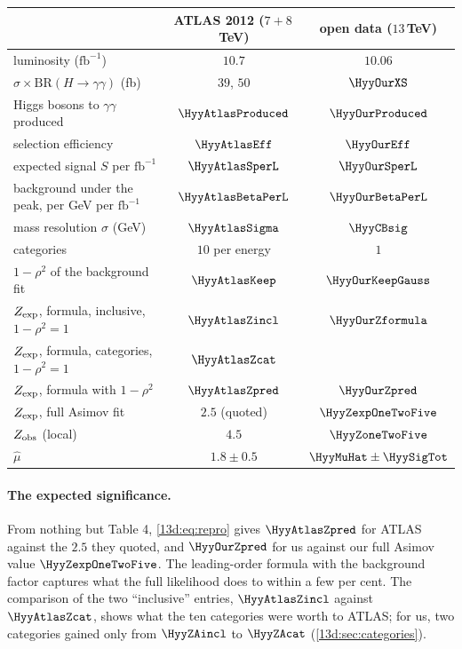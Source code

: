 \begin{center}
\small
\begin{tabular}{@{}lcc@{}}
\toprule
 & ATLAS 2012 ($7+8\,$TeV) & open data ($13\,$TeV)\\\midrule
luminosity ($\mathrm{fb}^{-1}$) & $10.7$ & $10.06$\\
$\sigma\times\mathrm{BR}(H\to\gamma\gamma)$ (fb) & $39$, $50$ & $\HyyOurXS$\\
Higgs bosons to $\gamma\gamma$ produced & $\HyyAtlasProduced$ & $\HyyOurProduced$\\
selection efficiency & $\HyyAtlasEff$ & $\HyyOurEff$\\
expected signal $S$ per $\mathrm{fb}^{-1}$ & $\HyyAtlasSperL$ & $\HyyOurSperL$\\
background under the peak, per GeV per $\mathrm{fb}^{-1}$ & $\HyyAtlasBetaPerL$ & $\HyyOurBetaPerL$\\
mass resolution $\sigma$ (GeV) & $\HyyAtlasSigma$ & $\HyyCBsig$\\
categories & $10$ per energy & $1$\\
$1-\rho^2$ of the background fit & $\HyyAtlasKeep$ & $\HyyOurKeepGauss$\\\midrule
$Z_{\rm exp}$, formula, inclusive, $1-\rho^2=1$ & $\HyyAtlasZincl$ & $\HyyOurZformula$\\
$Z_{\rm exp}$, formula, categories, $1-\rho^2=1$ & $\HyyAtlasZcat$ & \\
$Z_{\rm exp}$, formula with $1-\rho^2$ & $\HyyAtlasZpred$ & $\HyyOurZpred$\\
$Z_{\rm exp}$, full Asimov fit & $2.5$ (quoted) & $\HyyZexpOneTwoFive$\\
$Z_{\rm obs}$ (local) & $4.5$ & $\HyyZoneTwoFive$\\
$\hat\mu$ & $1.8\pm0.5$ & $\HyyMuHat\pm\HyySigTot$\\
\bottomrule
\end{tabular}
\end{center}

\paragraph{The expected significance.}
From nothing but Table 4, \eqref{13d:eq:repro} gives $\HyyAtlasZpred$ for ATLAS against
the $2.5$ they quoted, and $\HyyOurZpred$ for us against our full Asimov value
$\HyyZexpOneTwoFive$. The leading-order formula with the background factor captures what
the full likelihood does to within a few per cent. The comparison of the two
``inclusive'' entries, $\HyyAtlasZincl$ against $\HyyAtlasZcat$, shows what the ten
categories were worth to ATLAS; for us, two categories gained only from $\HyyZAincl$ to
$\HyyZAcat$ (\cref{13d:sec:categories}).

